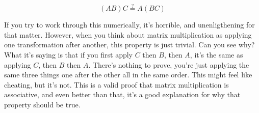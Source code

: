 \begin{equation*}
  (AB)C \stackrel{?}{=} A(BC)
\end{equation*}

If you try to work through this numerically, it's horrible, and unenligthening
for that matter. However, when you think about matrix multiplication as applying
one transformation after another, this property is just trivial. Can you see
why? What it's saying is that if you first apply $C$ then $B$, then $A$, it's
the same as applying $C$, then $B$ then $A$. There's nothing to prove, you're
just applying the same three things one after the other all in the same order.
This might feel like cheating, but it's not. This is a valid proof that matrix
multiplication is associative, and even better than that, it's a good
explanation for why that property should be true.
